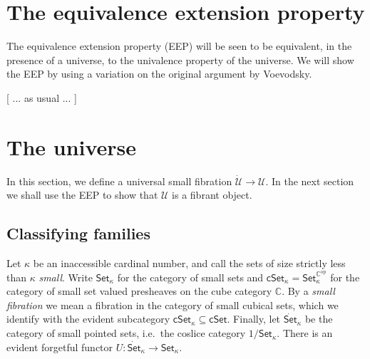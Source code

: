 \documentclass[11pt]{article}
\newcommand{\C}{\ensuremath{\mathbb{C}}}
\newcommand{\Set}{\ensuremath{\mathsf{Set}}}
\newcommand{\cSet}{\ensuremath{\mathsf{cSet}}}
\newcommand{\U}{\ensuremath{\mathcal{U}}}
\theoremstyle{remark}
\theoremstyle{definition}
\begin{document}
\section{The equivalence extension property}\label{sec:EEP}

The equivalence extension property (EEP) will be seen to be equivalent, in the presence of a universe, to the univalence property of the universe.  We will show the EEP by using a variation on the original argument by Voevodsky.  

[ ... as usual ... ] 

\section{The universe}\label{sec:U}

In this section, we define a universal small fibration $\dot{\U}\to \U$.  In the next section we shall use the EEP to show that $\U$ is a fibrant object.

\subsection{Classifying families}

Let $\kappa$ be an inaccessible cardinal number, and call the sets of size strictly less than $\kappa$ \emph{small}.  Write $\Set_\kappa$ for the category of small sets and $\cSet_\kappa = \Set_\kappa^{\C^{\mathrm{op}}}$ for the category of small set valued presheaves on the cube category $\C$.  By a \emph{small fibration} we mean a fibration in the category of small cubical sets, which we identify with the evident subcategory $\cSet_\kappa \subseteq \cSet$.  Finally, let $\dot{\Set}_\kappa$ be the category of small pointed sets, i.e.\ the coslice category $1/\Set_\kappa$.  There is an evident forgetful functor  $U:\dot{\Set}_\kappa \to {\Set}_\kappa$.
\end{document}
